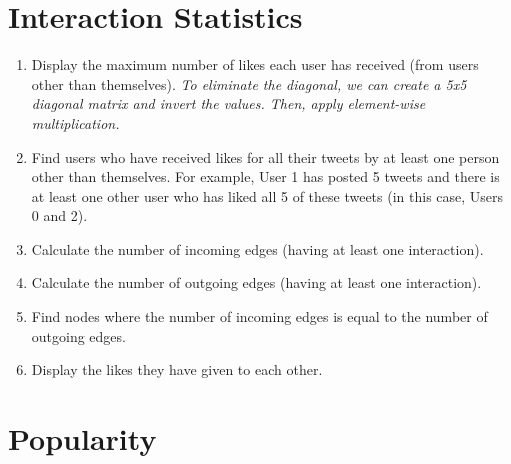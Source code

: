 \documentclass[11pt, a4paper]{article}
\begin{document}
\newpage
\section*{Interaction Statistics}

\begin{enumerate}
	\item Display the maximum number of likes each user has received (from users other than themselves).
	\textit{To eliminate the diagonal, we can create a 5x5 diagonal matrix and invert the values. Then, apply element-wise multiplication.}
	\item Find users who have received likes for all their tweets by at least one person other than themselves.
	For example, User 1 has posted 5 tweets and there is at least one other user who has liked all 5 of these tweets (in this case, Users 0 and 2).
	\item Calculate the number of incoming edges (having at least one interaction).
	\item Calculate the number of outgoing edges (having at least one interaction).
	\item Find nodes where the number of incoming edges is equal to the number of outgoing edges.
	\item Display the likes they have given to each other.
\end{enumerate}

\section*{Popularity}
\end{document}
